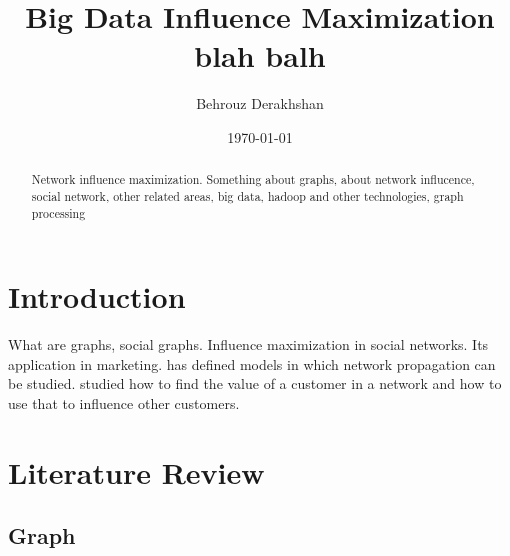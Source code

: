 \documentclass[english]{tktltiki}
\begin{document}
\onehalfspacing

\title{Big Data Influence Maximization blah balh}
\author{Behrouz Derakhshan}
\date{\today}

\maketitle



\begin{abstract}

Network influence maximization. Something about graphs, about network influcence, social network, other related areas, big data, hadoop and other technologies, graph processing

\end{abstract}

\mytableofcontents




\section{Introduction}
What are graphs, social graphs. Influence maximization in social networks. Its application in marketing.  \cite{kempe03} has defined models in which network propagation can be studied. 
\cite{domingo01} studied how to find the value of a customer in a network and how to use that to influence other customers.




\section{Literature Review}



\subsection{Graph}
\end{document}
